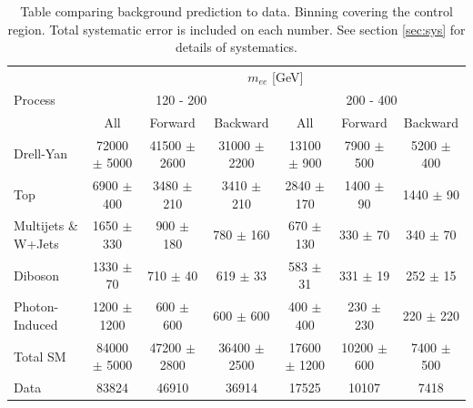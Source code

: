 	\begin {table}[h]
		\scriptsize  
		\begin{center}
		\begin{tabular}{  l | c c c | c c c  } 
			\hline
			\hline
			\multirow{3}{*}{Process} 	& \multicolumn{6}{c}{$m_{ee}$ [GeV]} \\
										& \multicolumn{3}{c}{120 - 200} & \multicolumn{3}{c}{200 - 400} \\
										\cline{2-7}
										& All & Forward & Backward & All & Forward & Backward \\
			\hline
			Drell-Yan & 72000 $\pm$ 5000 & 41500 $\pm$ 2600 & 31000 $\pm$ 2200 & 13100 $\pm$ 900 & 7900 $\pm$ 500 & 5200 $\pm$ 400 \\
			Top & 6900 $\pm$ 400 & 3480 $\pm$ 210 & 3410 $\pm$ 210 & 2840 $\pm$ 170 & 1400 $\pm$ 90 & 1440 $\pm$ 90 \\
			Multijets \& W+Jets & 1650 $\pm$ 330 & 900 $\pm$ 180 & 780 $\pm$ 160 & 670 $\pm$ 130 & 330 $\pm$ 70 & 340 $\pm$ 70 \\
			Diboson & 1330 $\pm$ 70 & 710 $\pm$ 40 & 619 $\pm$ 33 & 583 $\pm$ 31 & 331 $\pm$ 19 & 252 $\pm$ 15 \\
			Photon-Induced & 1200 $\pm$ 1200 & 600 $\pm$ 600 & 600 $\pm$ 600 & 400 $\pm$ 400 & 230 $\pm$ 230 & 220 $\pm$ 220 \\
			\hline
			Total SM & 84000 $\pm$ 5000 & 47200 $\pm$ 2800 & 36400 $\pm$ 2500 & 17600 $\pm$ 1200 & 10200 $\pm$ 600 & 7400 $\pm$ 500 \\
			\hline
			Data & 83824 & 46910 & 36914 & 17525 & 10107 & 7418 \\
			\hline
			\hline
		\end{tabular}
	  	\caption{Table comparing background prediction to data. Binning covering the control region. Total systematic error is included on each number. See section \ref{sec:sys} for details of systematics.}
	  	\label{tab:CI_results0}
	  	\end{center}
	\end {table}

